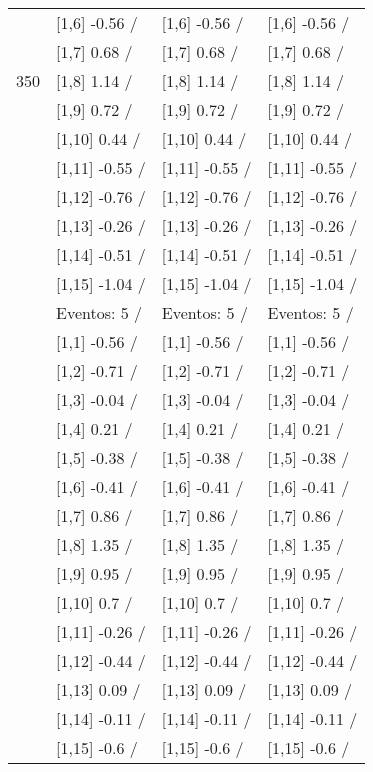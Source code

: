 \begin{table}
\begin{tabular}[t]{llll}
 & {}[1,6] -0.56  / & {}[1,6] -0.56  / & {}[1,6] -0.56  /\\
 & {}[1,7] 0.68  / & {}[1,7] 0.68  / & {}[1,7] 0.68  /\\
350 & {}[1,8] 1.14  / & {}[1,8] 1.14  / & {}[1,8] 1.14  /\\
\addlinespace
 & {}[1,9] 0.72  / & {}[1,9] 0.72  / & {}[1,9] 0.72  /\\
 & {}[1,10] 0.44  / & {}[1,10] 0.44  / & {}[1,10] 0.44  /\\
 & {}[1,11] -0.55  / & {}[1,11] -0.55  / & {}[1,11] -0.55  /\\
 & {}[1,12] -0.76  / & {}[1,12] -0.76  / & {}[1,12] -0.76  /\\
 & {}[1,13] -0.26  / & {}[1,13] -0.26  / & {}[1,13] -0.26  /\\
\addlinespace
 & {}[1,14] -0.51  / & {}[1,14] -0.51  / & {}[1,14] -0.51  /\\
 & {}[1,15] -1.04  / & {}[1,15] -1.04  / & {}[1,15] -1.04  /\\
 & Eventos:  5 / & Eventos:  5 / & Eventos:  5 /\\
 & {}[1,1] -0.56  / & {}[1,1] -0.56  / & {}[1,1] -0.56  /\\
 & {}[1,2] -0.71  / & {}[1,2] -0.71  / & {}[1,2] -0.71  /\\
\addlinespace
 & {}[1,3] -0.04  / & {}[1,3] -0.04  / & {}[1,3] -0.04  /\\
 & {}[1,4] 0.21  / & {}[1,4] 0.21  / & {}[1,4] 0.21  /\\
 & {}[1,5] -0.38  / & {}[1,5] -0.38  / & {}[1,5] -0.38  /\\
 & {}[1,6] -0.41  / & {}[1,6] -0.41  / & {}[1,6] -0.41  /\\
 & {}[1,7] 0.86  / & {}[1,7] 0.86  / & {}[1,7] 0.86  /\\
\addlinespace
500 & {}[1,8] 1.35  / & {}[1,8] 1.35  / & {}[1,8] 1.35  /\\
 & {}[1,9] 0.95  / & {}[1,9] 0.95  / & {}[1,9] 0.95  /\\
 & {}[1,10] 0.7  / & {}[1,10] 0.7  / & {}[1,10] 0.7  /\\
 & {}[1,11] -0.26  / & {}[1,11] -0.26  / & {}[1,11] -0.26  /\\
 & {}[1,12] -0.44  / & {}[1,12] -0.44  / & {}[1,12] -0.44  /\\
\addlinespace
 & {}[1,13] 0.09  / & {}[1,13] 0.09  / & {}[1,13] 0.09  /\\
 & {}[1,14] -0.11  / & {}[1,14] -0.11  / & {}[1,14] -0.11  /\\
 & {}[1,15] -0.6  / & {}[1,15] -0.6  / & {}[1,15] -0.6  /\\
\bottomrule
\end{tabular}
\end{table}

